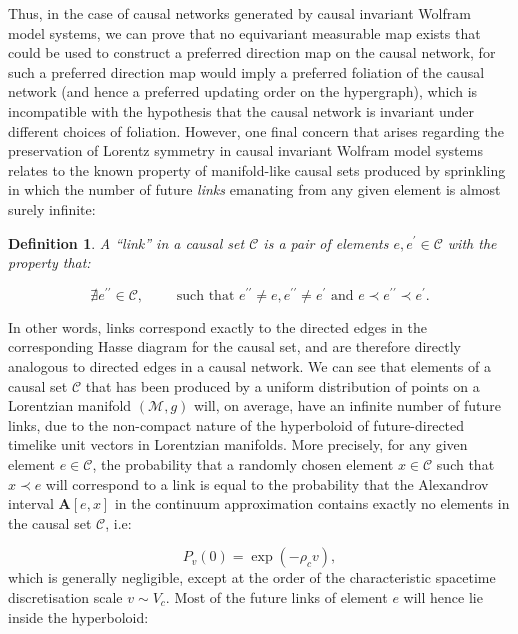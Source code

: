 \documentclass{article}
\newtheorem{definition}{Definition}
\begin{document}
Thus, in the case of causal networks generated by causal invariant Wolfram model systems, we can prove that no equivariant measurable map exists that could be used to construct a preferred direction map on the causal network, for such a preferred direction map would imply a preferred foliation of the causal network (and hence a preferred updating order on the hypergraph), which is incompatible with the hypothesis that the causal network is invariant under different choices of foliation. However, one final concern that arises regarding the preservation of Lorentz symmetry in causal invariant Wolfram model systems relates to the known property of manifold-like causal sets produced by sprinkling in which the number of future \textit{links} emanating from any given element is almost surely infinite:

\begin{definition}
A ``link'' in a causal set ${\mathcal{C}}$ is a pair of elements ${e, e^{\prime} \in \mathcal{C}}$ with the property that:

\begin{equation}
\nexists e^{\prime \prime} \in \mathcal{C}, \qquad \text{ such that } e^{\prime \prime} \neq e, e^{\prime \prime} \neq e^{\prime} \text{ and } e \prec e^{\prime \prime} \prec e^{\prime}.
\end{equation}
\end{definition}
In other words, links correspond exactly to the directed edges in the corresponding Hasse diagram for the causal set, and are therefore directly analogous to directed edges in a causal network. We can see that elements of a causal set ${\mathcal{C}}$ that has been produced by a uniform  distribution of points on a Lorentzian manifold ${\left( \mathcal{M}, g \right)}$ will, on average, have an infinite number of future links, due to the non-compact nature of the hyperboloid of future-directed timelike unit vectors in Lorentzian manifolds. More precisely, for any given element ${e \in \mathcal{C}}$, the probability that a randomly chosen element ${x \in \mathcal{C}}$ such that ${x \prec e}$ will correspond to a link is equal to the probability that the Alexandrov interval ${\mathbf{A} \left[ e, x \right]}$ in the continuum approximation contains exactly no elements in the causal set ${\mathcal{C}}$, i.e:

\begin{equation}
P_v \left( 0 \right) = \exp \left( - \rho_c v \right),
\end{equation}
which is generally negligible, except at the order of the characteristic spacetime discretisation scale ${v \sim V_c}$. Most of the future links of element $e$ will hence lie inside the hyperboloid:
\end{document}
